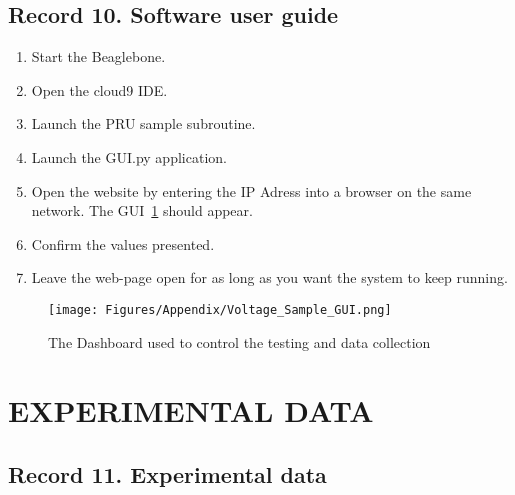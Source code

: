\subsection{Record 10. Software user guide}

\begin{enumerate}
    \item Start the Beaglebone.
    \item Open the cloud9 IDE.
    \item Launch the PRU sample subroutine.
    \item Launch the GUI.py application.
    \item Open the website by entering the IP Adress into a browser on the same network. The GUI~\ref{fig:Dash_1} should appear.
    \item Confirm the values presented.
    \item Leave the web-page open for as long as you want the system to keep running.
\end{enumerate}

\begin{figure}[H]
        \centering
        \texttt{[image: Figures/Appendix/Voltage\_Sample\_GUI.png]}
        \caption{The Dashboard used to control the testing and data collection}
        \label{fig:Dash_1}
    \end{figure}



\section{EXPERIMENTAL DATA}

\subsection{Record 11. Experimental data}




